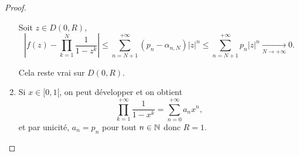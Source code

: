\documentclass[12pt]{article}
\begin{document}
\begin{proof}
\begin{enumerate}
        Soit $z\in D(0,R)$, 
        \begin{equation}
            \left\lvert f(z)-\prod_{k=1}^{N}\frac{1}{1-z^{k}}\right\rvert\leqslant\sum_{n=N+1}^{+\infty}\left(p_n-\alpha_{n,N}\right)\left\lvert z\right\rvert^{n}\leqslant\sum_{n=N+1}^{+\infty}p_n\left\lvert z\right\rvert^{n}\xrightarrow[N\to+\infty]{}0.
        \end{equation}

        Cela reste vrai sur $D(0,R)$.

        \item Si $x\in[0,1[$, on peut développer et on obtient
        \begin{equation}
            \prod_{k=1}^{+\infty}\frac{1}{1-x^{k}}=\sum_{n=0}^{+\infty}a_nx^{n},
        \end{equation}
        et par unicité, $a_n=p_n$ pour tout $n\in\mathbb{N}$ donc $R=1$.
    \end{enumerate}
\end{proof}
\end{document}
